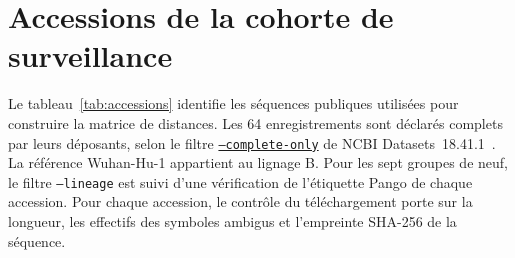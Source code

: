 \section{Accessions de la cohorte de surveillance}\label{sec:accessions}
Le tableau~\ref{tab:accessions} identifie les séquences publiques utilisées pour construire la matrice de distances. Les 64 enregistrements sont déclarés complets par leurs déposants, selon le filtre \href{https://ncbi.nlm.nih.gov/datasets/docs/v2/reference-docs/command-line/datasets/download/virus/genome/datasets_download_virus_genome_accession/}{\texttt{--complete-only}} de NCBI Datasets~18.41.1~\cite{ncbidatasets}. La référence Wuhan-Hu-1 appartient au lignage B. Pour les sept groupes de neuf, le filtre \texttt{--lineage} est suivi d'une vérification de l'étiquette Pango de chaque accession. Pour chaque accession, le contrôle du téléchargement porte sur la longueur, les effectifs des symboles ambigus et l’empreinte SHA-256 de la séquence.

